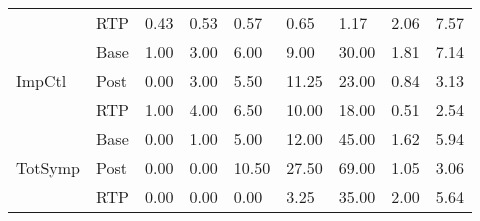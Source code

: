 \begin{tabular}{lllllllll}
\rowcolor[HTML]{EFEFEF}
 & \multicolumn{1}{l|}{\cellcolor[HTML]{EFEFEF}RTP} & 0.43 & 0.53 & 0.57 & 0.65 & 1.17 & 2.06 & 7.57 \\
 & \multicolumn{1}{l|}{Base} & 1.00 & 3.00 & 6.00 & 9.00 & 30.00 & 1.81 & 7.14 \\
ImpCtl & \multicolumn{1}{l|}{\cellcolor[HTML]{C0C0C0}Post} & \cellcolor[HTML]{C0C0C0}0.00 & \cellcolor[HTML]{C0C0C0}3.00 & \cellcolor[HTML]{C0C0C0}5.50 & \cellcolor[HTML]{C0C0C0}11.25 & \cellcolor[HTML]{C0C0C0}23.00 & \cellcolor[HTML]{C0C0C0}0.84 & \cellcolor[HTML]{C0C0C0}3.13 \\
 & \multicolumn{1}{l|}{RTP} & 1.00 & 4.00 & 6.50 & 10.00 & 18.00 & 0.51 & 2.54 \\
\rowcolor[HTML]{EFEFEF}
 & \multicolumn{1}{l|}{\cellcolor[HTML]{EFEFEF}Base} & 0.00 & 1.00 & 5.00 & 12.00 & 45.00 & 1.62 & 5.94 \\
\rowcolor[HTML]{C0C0C0}
\cellcolor[HTML]{EFEFEF}TotSymp & \multicolumn{1}{l|}{\cellcolor[HTML]{C0C0C0}Post} & 0.00 & 0.00 & 10.50 & 27.50 & 69.00 & 1.05 & 3.06 \\
\rowcolor[HTML]{EFEFEF}
 & \multicolumn{1}{l|}{\cellcolor[HTML]{EFEFEF}RTP} & 0.00 & 0.00 & 0.00 & 3.25 & 35.00 & 2.00 & 5.64
\end{tabular}
